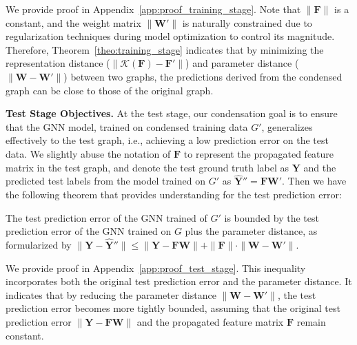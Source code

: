 We provide proof in Appendix~\ref{app:proof_training_stage}. Note that $\|\mathbf{F}\|$ is a constant, and the weight matrix $\| \mathbf{W}' \|$ is naturally constrained due to regularization techniques during model optimization to control its magnitude.  Therefore, Theorem~\ref{theo:training_stage} indicates that by minimizing the representation distance ($\| \mathcal{K}(\mathbf{F}) - \mathbf{F}' \|$) and parameter distance ($\| \mathbf{W} - \mathbf{W}' \|$) between two graphs, the predictions derived from the condensed graph can be close to those of the original graph.


\textbf{Test Stage Objectives.} At the test stage, our condensation goal is to ensure that the GNN model, trained on condensed training data $G'$, generalizes effectively to the test graph, i.e., achieving a low prediction error on the test data. We slightly abuse the notation of $\mathbf{F}$ to represent the propagated feature matrix in the test graph, and denote the test ground truth label as $\mathbf{Y}$ and the predicted test labels from the model trained on $G'$ as $\hat{\mathbf{Y}}''=\mathbf{F}\mathbf{W}'$.  Then we have the following theorem that provides understanding for the test prediction error:
\begin{theorem}   \label{theo:test_stage} 
    The test prediction error of the GNN trained of $G'$ is bounded by the test prediction error of the GNN trained on $G$ plus the parameter distance, as formularized by $ \| \mathbf{Y} - \hat{\mathbf{Y}}'' \| \leq \| \mathbf{Y} - \mathbf{F}\mathbf{W} \| + \|\mathbf{F}\| \cdot \| \mathbf{W}- \mathbf{W}'\|$.
\end{theorem}
We provide proof in Appendix~\ref{app:proof_test_stage}. This inequality incorporates both the original test prediction error and the parameter distance. It indicates that by reducing the parameter distance $\| \mathbf{W}- \mathbf{W}'\|$, the test prediction error becomes more tightly bounded, assuming that the original test prediction error \( \| \mathbf{Y} - \mathbf{F}\mathbf{W}\| \) and the propagated feature matrix \( \mathbf{F} \) remain constant. 

